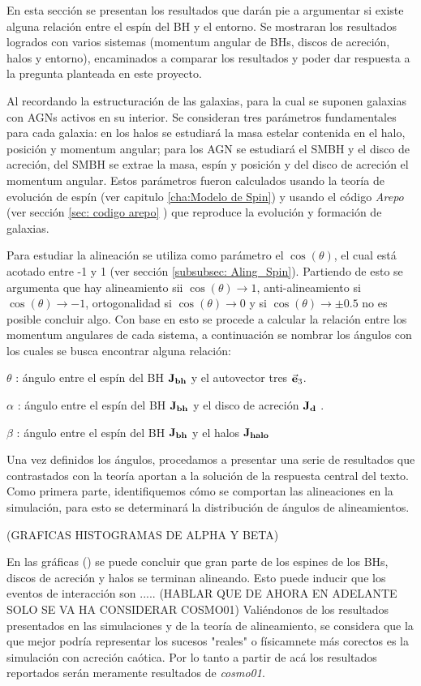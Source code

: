 En esta sección se presentan los resultados que darán pie a argumentar si existe alguna relación entre el espín del BH y el entorno. Se mostraran los resultados logrados con varios sistemas (momentum angular de BHs, discos de acreción, halos y entorno), encaminados a comparar los resultados y poder dar respuesta a la pregunta planteada en este proyecto. 

Al recordando la estructuración de las galaxias, para la cual  se suponen galaxias con AGNs activos en su interior. Se consideran tres parámetros fundamentales para cada galaxia: en los halos se estudiará la masa estelar contenida en el halo, posición y momentum angular; para los AGN se estudiará el SMBH y el disco de acreción, del SMBH se extrae la masa, espín y posición y del disco de acreción el momentum angular. Estos parámetros fueron calculados usando la teoría de evolución de espín (ver capitulo \ref{cha:Modelo de Spin}) y usando el código {\it{Arepo}} (ver sección \ref{sec: codigo arepo} ) que reproduce la evolución y formación de galaxias. 

Para estudiar la alineación se utiliza como parámetro el $\cos (\theta)$, el cual está acotado entre -1 y 1 (ver sección \ref{subsubsec: Aling_Spin}). Partiendo de esto se argumenta que hay alineamiento sii  $\cos (\theta) \to 1$, anti-alineamiento si $\cos (\theta)\to -1$, ortogonalidad si $\cos (\theta)\to 0$ y si $\cos (\theta)\to \pm 0.5 $ no es posible concluir algo. Con base en esto se procede a calcular la relación entre los momentum angulares de cada sistema, a continuación se nombrar los ángulos con los cuales se busca encontrar alguna relación:

$\theta$ : ángulo entre el espín del BH ${\bf{J_{bh}}}$ y el autovector tres $\vec{\bf{e}}_{3}$.

$\alpha$ : ángulo entre el espín del BH ${\bf{J_{bh}}}$  y el disco de acreción ${\bf{J_{d}}}$ .

$\beta$ :  ángulo entre el espín del BH ${\bf{J_{bh}}}$ y el halos ${\bf{J_{halo}}}$

Una vez definidos los ángulos, procedamos a presentar una serie de resultados que contrastados con la teoría aportan a la solución de la respuesta central del texto. Como primera parte, identifiquemos cómo se comportan las alineaciones en la simulación, para esto se determinará la distribución de ángulos de alineamientos. 


(GRAFICAS HISTOGRAMAS DE ALPHA Y BETA)

En las gráficas () se puede concluir que gran parte de los espines de los BHs, discos de acreción y halos se terminan alineando. Esto puede inducir que los eventos de interacción son .....
(HABLAR QUE DE AHORA EN ADELANTE SOLO SE VA HA CONSIDERAR COSMO01)
Valiéndonos de los resultados presentados en las simulaciones y de la teoría de alineamiento, se considera que la que mejor podría representar los sucesos "reales" o físicamnete más corectos es la simulación con acreción caótica. Por lo tanto a partir de acá los resultados reportados serán meramente resultados de {\it{cosmo01}}. 

